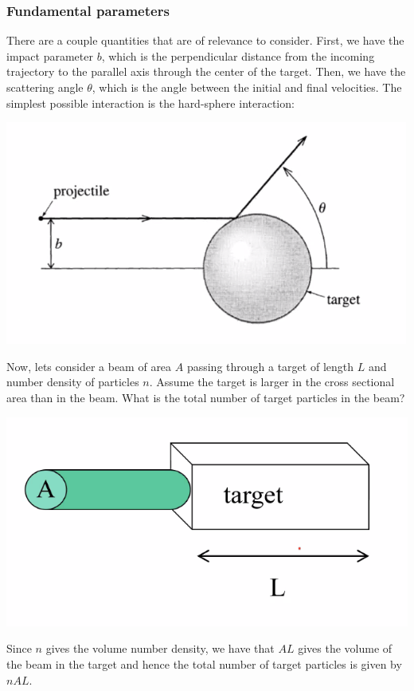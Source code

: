 \subsubsection{Fundamental parameters}
There are a couple quantities that are of relevance to consider. First, we have the impact parameter $b$, which is the perpendicular distance from the incoming trajectory to the parallel axis through the center of the target. Then, we have the scattering angle $\theta$, which is the angle between the initial and final velocities. The simplest possible interaction is the hard-sphere interaction:
\begin{center}
    \includegraphics[scale=0.8]{Lecture-27/l27-img3.png}
\end{center}
Now, lets consider a beam of area $A$ passing through a target of length $L$ and number density of particles $n$. Assume the target is larger in the cross sectional area than in the beam. What is the total number of target particles in the beam?
\begin{center}
    \includegraphics[scale=0.7]{Lecture-27/l27-img4.png}
\end{center}
\begin{s}
Since $n$ gives the volume number density, we have that $AL$ gives the volume of the beam in the target and hence the total number of target particles is given by $nAL$.
\end{s}
